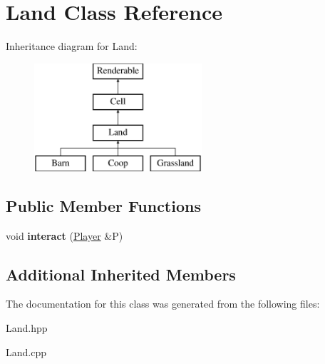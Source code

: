 \hypertarget{class_land}{}\section{Land Class Reference}
\label{class_land}
Inheritance diagram for Land\+:\begin{figure}[H]
\begin{center}
\leavevmode
\includegraphics[height=4.000000cm]{class_land}
\end{center}
\end{figure}
\subsection*{Public Member Functions}
\begin{DoxyCompactItemize}
\item 
\mbox{\label{class_land_a38e9e249cb53c6fd6c2cc975f863577a}} 
void {\bfseries interact} (\mbox{\hyperlink{class_player}{Player}} \&P)
\end{DoxyCompactItemize}
\subsection*{Additional Inherited Members}


The documentation for this class was generated from the following files\+:\begin{DoxyCompactItemize}
\item 
Land.\+hpp\item 
Land.\+cpp\end{DoxyCompactItemize}
